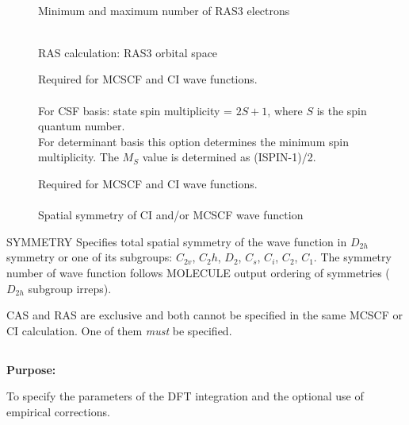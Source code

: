 \begin{description}
\item[]
    \\
   Minimum and maximum number of RAS3 electrons

\item[]
    \\
   RAS calculation: RAS3 orbital space

\item[]
  Required for MCSCF and CI wave
  functions.\\
  \\
  For CSF basis: state spin multiplicity = $2S + 1$,
  where $S$ is the spin quantum number. \\
  For determinant basis this option determines the minimum spin
  multiplicity.  The $M_S$ value is determined as (ISPIN-1)/2.

\item[]
  Required for MCSCF and CI wave functions.\\
   \\
  Spatial symmetry of CI and/or MCSCF wave function

\end{description}


\noindent SYMMETRY   Specifies total spatial symmetry of the wave
function in $D_{2h}$ symmetry or one of its subgroups: $C_{2v}$, $C_2h$,
$D_2$, $C_s$, $C_i$, $C_2$, $C_1$. The  symmetry number of wave
function follows MOLECULE output ordering of symmetries ($D_{2h}$
subgroup irreps).

\noindent
CAS and RAS are exclusive and
both cannot be specified in the same
MCSCF or CI
calculation. One of them {\em must} be specified.

\pagebreak[3]
\subsection{\label{ref-dftinp}}

{\bf Purpose:}

To specify the parameters of the DFT integration and the optional use of empirical corrections.

